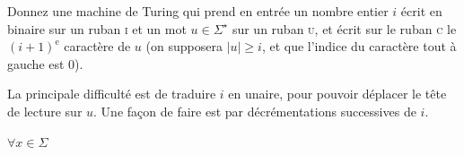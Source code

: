 
\begingroup

\begin{exercice}\label{exo:turingmachines/expressiveness/at}


  \begin{questions}
  \item Donnez une machine de Turing qui prend en entrée un nombre entier $i$ écrit en binaire sur un ruban \textsc{i}
    et un mot $u \in \Sigma^\star$ sur un ruban \textsc{u},
    et écrit sur le ruban \textsc{c} le $(i+1)^{\text{e}}$ caractère de $u$ (on supposera $|u| \ge i$, et que l'indice du caractère tout à gauche est 0).
  \end{questions}

  \begin{corrections}
    La principale difficulté est de traduire $i$ en unaire, pour pouvoir déplacer le tête de lecture sur $u$. Une façon de faire est par décrémentations successives de $i$.

    \begin{algorithm}[H]
    \end{algorithm}

    \begin{center}
      $\forall x\in \Sigma$
    \end{center}
  \end{corrections}
  
\end{exercice}

\endgroup
\endinput
